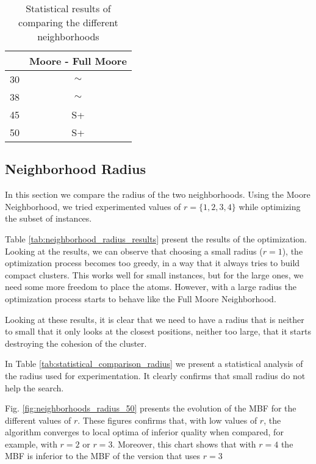 		\begin{table}[!htdp]
				\begin{center}
					\begin{tabular}{| c | c |}
						\hline
						~ & \textbf{Moore - Full Moore} \\ \hline
						30 & $\sim$ \\ \hline
						38 & $\sim$ \\ \hline
						45 & S+ \\ \hline
						50 & S+ \\ \hline
					\end{tabular}
					\caption{Statistical results of comparing the different neighborhoods}
					\label{tab:statistical_comparison_neighborhoods}
				\end{center}
		\end{table}
		
		\pagebreak
		\subsection{Neighborhood Radius}
		
		In this section we compare the radius of the two neighborhoods. Using the Moore Neighborhood, we tried experimented values of $r = \{1, 2, 3, 4\}$ while optimizing the subset of instances.
		
		Table \ref{tab:neighborhood_radius_results} present the results of the optimization. Looking at the results, we can observe that choosing a small radius ($r=1$), the optimization process becomes too greedy, in a way that it always tries to build compact clusters. This works well for small instances, but for the large ones, we need some more freedom to place the atoms. However, with a large radius the optimization process starts to behave like the Full Moore Neighborhood. 
		
		Looking at these results, it is clear that we need to have a radius that is neither to small that it only looks at the closest positions, neither too large, that it starts destroying the cohesion of the cluster.
		
		In Table \ref{tab:statistical_comparison_radius} we present a statistical analysis of the radius used for experimentation. It clearly confirms that small radius do not help the search.
		
		Fig. \ref{fig:neighborhoods_radius_50} presents the evolution of the MBF for the different values of $r$. These figures confirms that, with low values of $r$, the algorithm converges to local optima of inferior quality when compared, for example, with $r=2$ or $r=3$. Moreover, this chart shows that with $r=4$ the MBF is inferior to the MBF of the version that uses $r=3$
		
